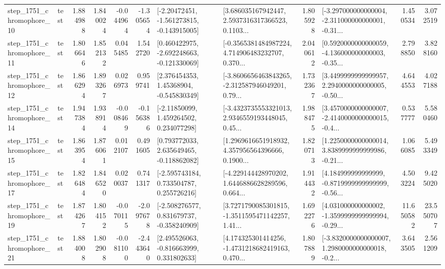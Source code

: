 \begin{tabular}{llrrrrllrlrr}
 step\_1751\_chromophore\_10 &      test &      1.884988 &    1.840024 &     -0.044964 & -1.305654 &   [-2.20472451, -1.561273815, -0.143915005] &  [3.686035167942447, 2.5937316317366523, 0.1103... &       1.805928 &  [-3.297000000000004, -2.311000000000001, -0.31... &            1.450534 &          3.072519 \\
 step\_1751\_chromophore\_11 &      test &      1.806646 &    1.852132 &      0.045485 &  1.542720 &   [0.460422975, -2.692248663, -0.121330069] &  [-0.3565381484987224, 4.714906483232707, 0.370... &       2.040612 &  [0.5920000000000059, -4.136000000000003, -0.35... &            2.798850 &          3.828160 \\
 step\_1751\_chromophore\_12 &      test &      1.866294 &    1.893267 &      0.026973 &  0.959741 &     [2.376454353, 1.45368904, -0.545830349] &  [-3.8606656463843265, -2.312587946049201, 0.79... &       1.732367 &  [3.4499999999999957, 2.2940000000000005, -0.50... &            4.644553 &          4.027188 \\
 step\_1751\_chromophore\_14 &      test &      1.947384 &    1.938914 &     -0.008469 & -0.156386 &     [-2.11850099, 1.459264502, 0.234077298] &  [-3.4323735553321013, 2.9346559193448045, 0.45... &       1.988475 &  [3.4570000000000007, -2.4140000000000015, -0.4... &            0.537777 &          5.580460 \\
 step\_1751\_chromophore\_15 &      test &      1.863954 &    1.876061 &      0.012107 &  0.491605 &    [0.793772033, 2.635649465, -0.118862082] &  [1.2969616651918932, 4.357956564396666, 0.1900... &       1.820713 &  [1.2250000000000014, 3.8389999999999986, -0.21... &            1.066085 &          5.493349 \\
 step\_1751\_chromophore\_17 &      test &      1.826484 &    1.846520 &      0.020037 &  0.741317 &    [-2.595743184, 0.733504787, 0.255726216] &  [-4.229144428970202, 1.6446886628289596, 0.664... &       1.914432 &  [4.184999999999999, -0.8719999999999999, -0.56... &            4.503224 &          9.425020 \\
 step\_1751\_chromophore\_19 &      test &      1.874267 &    1.804152 &     -0.070115 & -2.097678 &   [-2.508276577, 0.831679737, -0.358240909] &  [3.7271790085301815, -1.3511595471142257, 1.41... &       1.692276 &  [4.031000000000002, -1.3599999999999994, -0.29... &           11.650582 &         23.550707 \\
 step\_1751\_chromophore\_21 &      test &      1.884008 &    1.802908 &     -0.081100 & -2.443640 &    [2.495526063, -0.816663999, 0.331802633] &  [4.174325301414256, -1.4731218682419163, 0.470... &       1.807889 &  [-3.8320000000000007, 1.2980000000000018, -0.2... &            3.643505 &          2.561209 \\

\end{tabular}
